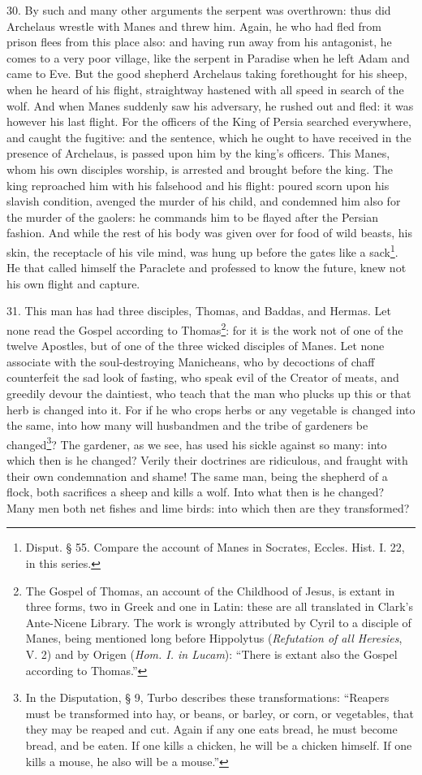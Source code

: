 30. By such and many other arguments the serpent was overthrown: thus did Archelaus wrestle with Manes and threw him. Again, he who had fled from prison flees from this place also: and having run away from his antagonist, he comes to a very poor village, like the serpent in Paradise when he left Adam and came to Eve. But the good shepherd Archelaus taking forethought for his sheep, when he heard of his flight, straightway hastened with all speed in search of the wolf. And when Manes suddenly saw his adversary, he rushed out and fled: it was however his last flight. For the officers of the King of Persia searched everywhere, and caught the fugitive: and the sentence, which he ought to have received in the presence of Archelaus, is passed upon him by the king’s officers. This Manes, whom his own disciples worship, is arrested and brought before the king. The king reproached him with his falsehood and his flight: poured scorn upon his slavish condition, avenged the murder of his child, and condemned him also for the murder of the gaolers: he commands him to be flayed after the Persian fashion. And while the rest of his body was given over for food of wild beasts, his skin, the receptacle of his vile mind, was hung up before the gates like a sack\footnote{Disput. § 55. Compare the account of Manes in Socrates, Eccles. Hist. I. 22, in this series.}. He that called himself the Paraclete and professed to know the future, knew not his own flight and capture.

31. This man has had three disciples, Thomas, and Baddas, and Hermas. Let none read the Gospel according to Thomas\footnote{The Gospel of Thomas, an account of the Childhood of Jesus, is extant in three forms, two in Greek and one in Latin: these are all translated in Clark’s Ante-Nicene Library. The work is wrongly attributed by Cyril to a disciple of Manes, being mentioned long before Hippolytus (\emph{Refutation of all Heresies}, V. 2) and by Origen (\emph{Hom. I. in Lucam}): “There is extant also the Gospel according to Thomas.”}: for it is the work not of one of the twelve Apostles, but of one of the three wicked disciples of Manes. Let none associate with the soul-destroying Manicheans, who by decoctions of chaff counterfeit the sad look of fasting, who speak evil of the Creator of meats, and greedily devour the daintiest, who teach that the man who plucks up this or that herb is changed into it. For if he who crops herbs or any vegetable is changed into the same, into how many will husbandmen and the tribe of gardeners be changed\footnote{In the Disputation, § 9, Turbo describes these transformations: “Reapers must be transformed into hay, or beans, or barley, or corn, or vegetables, that they may be reaped and cut. Again if any one eats bread, he must become bread, and be eaten. If one kills a chicken, he will be a chicken himself. If one kills a mouse, he also will be a mouse.”}? The gardener, as we see, has used his sickle against so many: into which then is he changed? Verily their doctrines are ridiculous, and fraught with their own condemnation and shame! The same man, being the shepherd of a flock, both sacrifices a sheep and kills a wolf. Into what then is he changed? Many men both net fishes and lime birds: into which then are they transformed?

